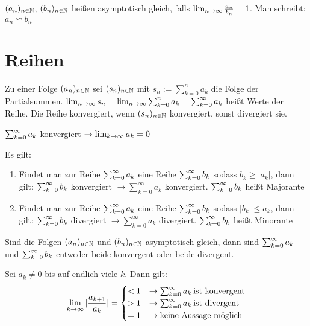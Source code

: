 \documentclass[]{article}
\begin{document}
\begin{definition}
	 $(a_{n})_{n \in \mathbb{N}}$,  $(b_{n})_{n \in \mathbb{N}}$ heißen asymptotisch gleich, falls $\lim_{n \rightarrow \infty} \frac{a_n}{b_n} = 1$. Man schreibt: $a_n \backsimeq b_n$
\end{definition}

\section{Reihen}


\begin{definition}
	Zu einer Folge $(a_{n})_{n \in \mathbb{N}}$ sei $(s_n)_{n \in \mathbb{N}}$ mit $s_n := \sum_{k=0}^{n} a_k$ die Folge der Partialsummen. $\lim_{n \rightarrow \infty} s_n = \lim_{n \rightarrow \infty} \sum_{k=0}^{n} a_k = \sum_{k = 0}^{\infty} a_{k}$ heißt Werte der Reihe. Die Reihe konvergiert, wenn $(s_n)_{n \in \mathbb{N}}$ konvergiert, sonst divergiert sie.
\end{definition}

\begin{satz}[Konvergenzkriterium]
	 $\sum_{k = 0}^{\infty} a_{k} $ konvergiert $\rightarrow \lim_{k \rightarrow \infty} a_k = 0$
\end{satz}

\begin{satz}[Majorantenkriterium]
	Es gilt:
	\begin{enumerate}[noitemsep]
		\item Findet man zur Reihe	$\sum_{k = 0}^{\infty} a_{k}$ eine Reihe $\sum_{k = 0}^{\infty} b_{k} $ sodass $b_k \geq |a_k|$, dann gilt: $\sum_{k = 0}^{\infty} b_{k}$ konvergiert $\rightarrow \sum_{k=0}^{\infty} a_k $ konvergiert. $\sum_{k = 0}^{\infty} b_{k} $ heißt Majorante
		\item Findet man zur Reihe	$\sum_{k = 0}^{\infty} a_{k}$ eine Reihe $\sum_{k = 0}^{\infty} b_{k} $ sodass $|b_k| \leq a_k$, dann gilt: $\sum_{k = 0}^{\infty} b_{k}$ divergiert $\rightarrow \sum_{k=0}^{\infty} a_k $ divergiert. $\sum_{k = 0}^{\infty} b_{k} $ heißt Minorante	
	\end{enumerate}
\end{satz}

\begin{satz}[Konvergenzkriterium]
	Sind die Folgen $(a_{n})_{n \in \mathbb{N}}$ und $(b_{n})_{n \in \mathbb{N}}$ asymptotisch gleich, dann sind $\sum_{k = 0}^{\infty} a_{k}$ und $\sum_{k = 0}^{\infty} b_{k}$ entweder beide konvergent oder beide divergent.
\end{satz}

\begin{satz}[Quotientenkriterium]
	Sei $a_k \neq 0$ bis auf endlich viele $k$. Dann gilt:
	\begin{equation}
		\lim_{k \rightarrow \infty} | \frac{a_{k + 1}}{a_k} | = 
		\begin{cases}
		< 1 & \rightarrow \sum_{k=0}^{\infty} a_k \medspace \textnormal{ist konvergent} \\ 
		> 1 & \rightarrow \sum_{k=0}^{\infty} a_k \medspace \textnormal{ist divergent}  \\
		= 1 & \rightarrow \textnormal{keine Aussage möglich}
		\end{cases}
	\end{equation}
\end{satz}
\end{document}
